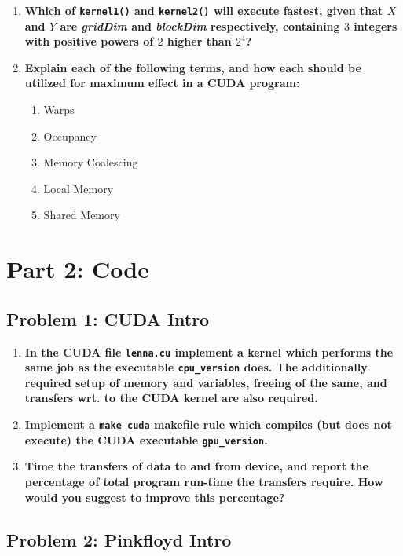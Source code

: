 \begin{enumerate}
\item \textbf{Which of \texttt{kernel1()} and \texttt{kernel2()} will execute fastest, given that $X$ and $Y$ are \textit{gridDim} and \textit{blockDim} respectively, containing $3$ integers with positive powers of $2$ higher than $2^4$?}

\item \textbf{Explain each of the following terms, and how each should be utilized for maximum effect in a CUDA program:}

\begin{enumerate}
\item Warps
\item Occupancy
\item Memory Coalescing
\item Local Memory
\item Shared Memory
\end{enumerate}

\end{enumerate}

\section*{Part 2: Code}

\subsection*{Problem 1: CUDA Intro}

\begin{enumerate}

\item \textbf{In the CUDA file \texttt{lenna.cu} implement a kernel which performs the same job as the executable \texttt{cpu\_version} does. The additionally required setup of memory and variables, freeing of the same, and transfers wrt. to the CUDA kernel are also required.}

\item \textbf{Implement a \texttt{make cuda} makefile rule which compiles (but does not execute) the CUDA executable \texttt{gpu\_version}.}

\item \textbf{Time the transfers of data to and from device, and report the percentage of total program run-time the transfers require. How would you suggest to improve this percentage?}

\end{enumerate}

\subsection*{Problem 2: Pinkfloyd Intro}



